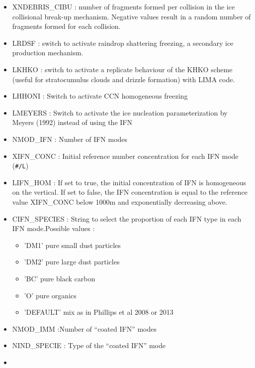 \begin{itemize}
\item
{}
XNDEBRIS\_CIBU : number of fragments formed per collision in the ice collisional break-up mechanism. Negative values result in a random number of fragments formed for each collision.
\item
{}
LRDSF : switch to activate raindrop shattering freezing, a secondary ice production mechanism.
\item
{}
LKHKO : switch to activate a replicate behaviour of the KHKO scheme (useful for stratocumulus clouds and drizzle formation) with LIMA code.
\item
{}
LHHONI : Switch to activate CCN homogeneous freezing
\item
{}
LMEYERS : Switch to activate the ice nucleation parameterization by Meyers (1992) instead of using the IFN
\item
{}
NMOD\_IFN : Number of IFN modes
\item
{}
XIFN\_CONC : Initial reference number concentration for each IFN mode (\verb?#/L?)
\item
{}
LIFN\_HOM : If set to true, the initial concentration of IFN is homogeneous on the vertical. If set to false, the IFN concentration is equal to the reference value XIFN\_CONC below 1000m and exponentially decreasing above.
\item
{}
CIFN\_SPECIES : String to select the proportion of each IFN type in each IFN mode.Possible values :
\begin{itemize}
\item 'DM1' pure small dust particles
\item 'DM2' pure large dust particles
\item 'BC'  pure black carbon
\item 'O'   pure organics
\item 'DEFAULT' mix as in Phillips et al 2008 or 2013
\end{itemize}
\item
{}
NMOD\_IMM :Number of “coated IFN” modes
\item
{}
NIND\_SPECIE : Type of the “coated IFN” mode
\item

\end{itemize}
